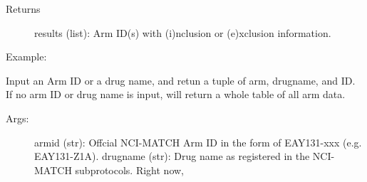 \documentclass[letterpaper,10pt,english]{sphinxmanual}
\begin{document}
\begin{fulllineitems}
\begin{fulllineitems}
\begin{description}
\item[{Returns}] \leavevmode
results (list):  Arm ID(s) with (i)nclusion or (e)xclusion information.

\item[{Example:}] \leavevmode
\begin{sphinxVerbatim}[commandchars=\\\{\}]
                      
\end{sphinxVerbatim}

\end{description}

\end{fulllineitems}


\begin{fulllineitems}
\label{\detokenize{matchbox_api_utils:matchbox_api_utils.TreatmentArms.map_drug_arm}}
Input an Arm ID or a drug name, and retun a tuple of arm, drugname, and ID. If no arm ID or
drug name is input, will return a whole table of all arm data.
\begin{description}
\item[{Args:}] \leavevmode
armid (str): Offcial NCI-MATCH Arm ID in the form of EAY131-xxx (e.g. EAY131-Z1A).
drugname (str): Drug name as registered in the NCI-MATCH subprotocols.  Right now,
\begin{quote}


\end{quote}
\end{description}
\end{fulllineitems}
\end{fulllineitems}
\end{document}
